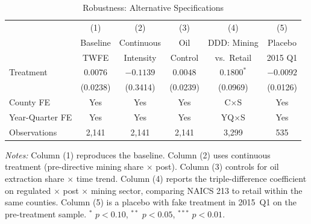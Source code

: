 \begin{table}[htbp]
\centering
\caption{Robustness: Alternative Specifications}
\label{tab:robustness}
\begin{threeparttable}
\begin{tabular}{lccccc}
\toprule
 & (1) & (2) & (3) & (4) & (5) \\
 & Baseline & Continuous & Oil & DDD: Mining & Placebo \\
 & TWFE & Intensity & Control & vs.~Retail & 2015 Q1 \\
\midrule
Treatment & $0.0076$ & $-0.1139$ & $0.0048$ & $0.1800^{*}$ & $-0.0092$ \\
 & (0.0238) & (0.3414) & (0.0239) & (0.0969) & (0.0126) \\
\midrule
County FE & Yes & Yes & Yes & C$\times$S & Yes \\
Year-Quarter FE & Yes & Yes & Yes & YQ$\times$S & Yes \\
Observations & 2,141 & 2,141 & 2,141 & 3,299 & 535 \\
\bottomrule
\end{tabular}
\begin{tablenotes}[flushleft]\footnotesize
\item \textit{Notes:} Column (1) reproduces the baseline. Column (2) uses continuous treatment (pre-directive mining share $\times$ post). Column (3) controls for oil extraction share $\times$ time trend. Column (4) reports the triple-difference coefficient on regulated $\times$ post $\times$ mining sector, comparing NAICS 213 to retail within the same counties. Column (5) is a placebo with fake treatment in 2015~Q1 on the pre-treatment sample. $^{*}$ $p<0.10$, $^{**}$ $p<0.05$, $^{***}$ $p<0.01$.
\end{tablenotes}
\end{threeparttable}
\end{table}

